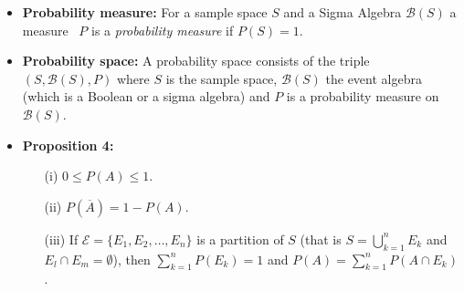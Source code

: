 \begin{itemize}
\item {\bf Probability measure:} For a sample space $S$ and a Sigma Algebra $\mathcal{B}(S)$ a measure \, $P$ is a {\it probability measure} if $P(S)=1$.

\item {\bf Probability space:} A probability space consists of the triple $(S,\mathcal{B}(S), P)$ where $S$ is the sample space, $\mathcal{B}(S)$ the event algebra (which is a Boolean or a sigma algebra) and $P$ is a  probability measure on $\mathcal{B}(S)$. 

\item {\bf Proposition 4:} 
\begin{itemize}
\item[(i)] $0 \le P(A) \le 1$.
\item[(ii)] $P(\overline{A}) = 1-P(A)$.
\item[(iii)] If $\mathcal{E}= \{E_1, E_2, \dots, E_n\}$ is a partition of $S$ (that is $S= \bigcup_{k=1}^n E_k$ and $E_l \cap E_m = \emptyset$), then \quad $\sum_{k=1}^n P(E_k) = 1$ \quad and \quad $P(A)=\sum_{k=1}^n P(A\cap E_k)$.
\end{itemize}


\end{itemize}

